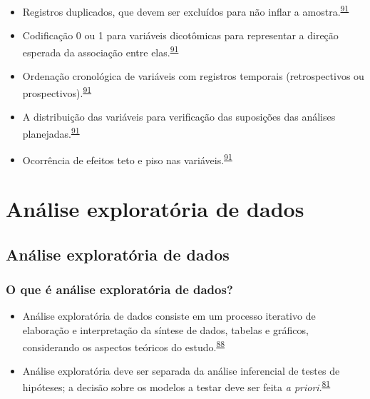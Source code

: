 \documentclass[
  a4paper,
]{book}
\begin{document}
\begin{itemize}
\item
  Registros duplicados, que devem ser excluídos para não inflar a amostra.\textsuperscript{\protect\hyperlink{ref-huebner2016}{91}}
\item
  Codificação 0 ou 1 para variáveis dicotômicas para representar a direção esperada da associação entre elas.\textsuperscript{\protect\hyperlink{ref-huebner2016}{91}}
\item
  Ordenação cronológica de variáveis com registros temporais (retrospectivos ou prospectivos).\textsuperscript{\protect\hyperlink{ref-huebner2016}{91}}
\item
  A distribuição das variáveis para verificação das suposições das análises planejadas.\textsuperscript{\protect\hyperlink{ref-huebner2016}{91}}
\item
  Ocorrência de efeitos teto e piso nas variáveis.\textsuperscript{\protect\hyperlink{ref-huebner2016}{91}}
\end{itemize}

\hypertarget{analise-exploratoria-dados}{%
\chapter{\texorpdfstring{\textbf{Análise exploratória de dados}}{Análise exploratória de dados}}\label{analise-exploratoria-dados}}

\hypertarget{analise-exploratoria}{%
\section{Análise exploratória de dados}\label{analise-exploratoria}}

\hypertarget{o-que-uxe9-anuxe1lise-exploratuxf3ria-de-dados}{%
\subsection{O que é análise exploratória de dados?}\label{o-que-uxe9-anuxe1lise-exploratuxf3ria-de-dados}}

\begin{itemize}
\item
  Análise exploratória de dados consiste em um processo iterativo de elaboração e interpretação da síntese de dados, tabelas e gráficos, considerando os aspectos teóricos do estudo.\textsuperscript{\protect\hyperlink{ref-Ferketich1986}{88}}
\item
  Análise exploratória deve ser separada da análise inferencial de testes de hipóteses; a decisão sobre os modelos a testar deve ser feita \emph{a priori}.\textsuperscript{\protect\hyperlink{ref-zuur2009}{81}}
\end{itemize}
\end{document}
